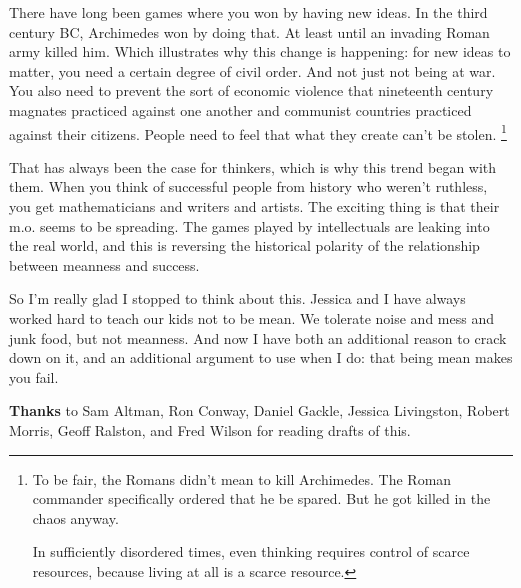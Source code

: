 There have long been games where you won by having new ideas. In the
third century BC, Archimedes won by doing that. At least until an
invading Roman army killed him. Which illustrates why this change is
happening: for new ideas to matter, you need a certain degree of civil
order. And not just not being at war. You also need to prevent the sort
of economic violence that nineteenth century magnates practiced against
one another and communist countries practiced against their citizens.
People need to feel that what they create can't be stolen.
\footnote{To be fair, the Romans didn't mean to kill Archimedes. The Roman
commander specifically ordered that he be spared. But he got killed in
the chaos anyway.

In sufficiently disordered times, even thinking requires control of
scarce resources, because living at all is a scarce resource.}

That has always been the case for thinkers, which is why this trend
began with them. When you think of successful people from history who
weren't ruthless, you get mathematicians and writers and artists. The
exciting thing is that their m.o. seems to be spreading. The games
played by intellectuals are leaking into the real world, and this is
reversing the historical polarity of the relationship between meanness
and success.

So I'm really glad I stopped to think about this. Jessica and I have
always worked hard to teach our kids not to be mean. We tolerate noise
and mess and junk food, but not meanness. And now I have both an
additional reason to crack down on it, and an additional argument to use
when I do: that being mean makes you fail.


\textbf{Thanks} to Sam Altman, Ron Conway, Daniel Gackle, Jessica
Livingston, Robert Morris, Geoff Ralston, and Fred Wilson for reading
drafts of this.